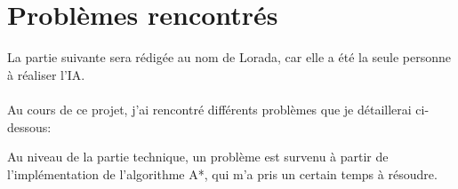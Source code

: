 \documentclass[a4paper, 12pt]{article}
\begin{document}
\newpage %

\section{Problèmes rencontrés}

    La partie suivante sera rédigée au nom de Lorada, car elle a été la seule personne à réaliser l'IA.
    \paragraph{}
    Au cours de ce projet, j'ai rencontré différents problèmes que je détaillerai ci-dessous:

    Au niveau de la partie technique, un problème est survenu à partir de l'implémentation de l'algorithme A*, qui m'a pris un certain temps à résoudre. 
\end{document}
